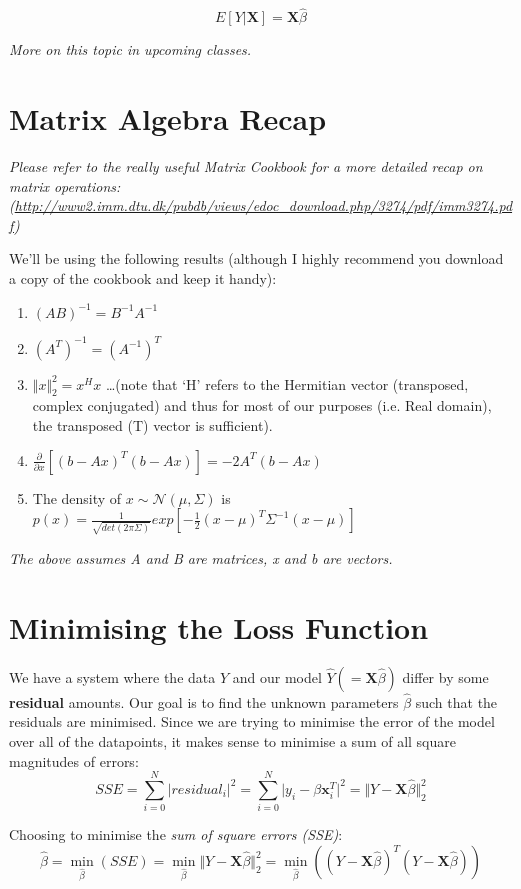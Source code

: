 \documentclass{article}
\begin{document}
$$
E[Y \vert \mathbf{X}] = \mathbf{X} \hat{\beta}
$$

\textit{More on this topic in upcoming classes.}

\section{Matrix Algebra Recap}
\textit{Please refer to the really useful Matrix Cookbook for a more detailed recap on matrix operations: (\url{http://www2.imm.dtu.dk/pubdb/views/edoc_download.php/3274/pdf/imm3274.pdf})}

We'll be using the following results (although I highly recommend you download a copy of the cookbook \cite{petersen2008matrix} and keep it handy):

\begin{enumerate}
  \item $(AB)^{-1} = B^{-1}A^{-1}$
  \item $(A^T)^{-1} = (A^{-1})^{T}$
  \item $\Vert x \Vert_2^2 = x^Hx$ \dots (note that `H' refers to the Hermitian vector (transposed, complex conjugated) and thus for most of our purposes (i.e. Real domain), the transposed (T) vector is sufficient).
  \item $\frac{\partial}{\partial x}[(b - Ax)^T(b-Ax)] = -2A^T(b-Ax)$
  \item The density of $x \sim \mathcal{N}(\mu, \Sigma)$ is $p(x) = \frac{1}{\sqrt{det(2\pi \Sigma)}}exp[-\frac{1}{2}(x-\mu)^T \Sigma^{-1}(x-\mu)]$
\end{enumerate}

\textit{The above assumes A and B are matrices, x and b are vectors.}

\section{Minimising the Loss Function}
We have a system where the data $Y$ and our model $\hat{Y} (=\mathbf{X}\hat{\beta})$ differ by some \textbf{residual} amounts. Our goal is to find the unknown parameters $\hat{\beta}$ such that the residuals are minimised. Since we are trying to minimise the error of the model over all of the datapoints, it makes sense to minimise a sum of all square magnitudes of errors:
$$
SSE = \sum\limits_{i=0}^{N}\vert residual_i \vert^2 = \sum\limits_{i=0}^{N}\vert y_i - \beta\mathbf{x}_i^T \vert^2 = \Vert Y - \mathbf{X}\hat{\beta} \Vert_2^2
$$

Choosing to minimise the \textit{sum of square errors (SSE)}:
$$
\hat{\beta} = \min_{\hat{\beta}} (SSE) = \min_{\hat{\beta}}\Vert Y - \mathbf{X}\hat{\beta} \Vert_2^2 = \min_{\hat{\beta}}((Y - \mathbf{X}\hat{\beta})^T(Y - \mathbf{X}\hat{\beta}))
$$
\end{document}
